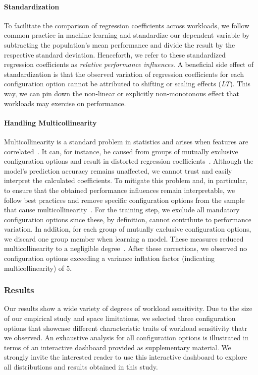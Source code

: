 {{{\paragraph*{Standardization}
To facilitate the comparison of regression coefficients across workloads, we follow common practice in machine learning and standardize our dependent variable by subtracting the population’s mean performance and divide the result by the respective standard deviation. Henceforth, we refer to these standardized regression coefficients as \textit{relative performance influences}. A beneficial side effect of standardization is that the observed variation of regression coefficients for each configuration option cannot be attributed to shifting or scaling effects (\colorbox{lt-color!60}{\textit{LT}}). This way, we can pin down  the non-linear or explicitly non-monotonous effect that workloads may exercise on performance.
\paragraph*{Handling Multicollinearity} Multicollinearity is a standard problem in statistics and arises when features are correlated~\cite{Daoud_2017}. It can, for instance, be caused from groups of mutually exclusive configuration options and result in distorted regression coefficients~\cite{dorn2020}. Although the model's prediction accuracy remains unaffected, we cannot trust and easily interpret the calculated coefficients. To mitigate this problem and, in particular, to ensure that the obtained performance influences remain interpretable, we follow best practices and remove specific configuration options from the sample that cause multicollinearity~\cite{dorn2020}. For the training step, we exclude all mandatory configuration options since these, by definition, cannot contribute to performance variation. In addition, for each group of mutually exclusive configuration options, we discard one group member when learning a model. These measures reduced multicollinearity to a negligible degree~\cite{o2007caution}.  After these corrections, we observed no configuration options exceeding a variance inflation factor (indicating multicollinearity) of 5.


\subsubsection{Results}\label{sec:results2}


	
Our results show a wide variety of degrees of workload sensitivity. Due to the size of our empirical study and space limitations, we selected three configuration options that showcase different characteristic traits of workload sensitivity thatr we observed. An exhaustive analysis for all configuration options is illustrated in terms of an interactive dashboard provided as supplementary material. We strongly invite the interested reader to use this interactive dashboard to explore all distributions and results obtained in this study.

}}}
